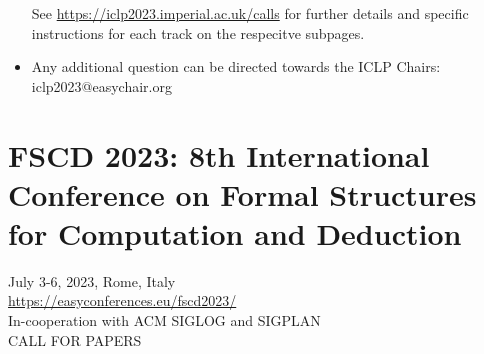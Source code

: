 \documentclass[prodmode,acmtecs]{acmsmall} %
\begin{document}
\begin{itemize}
  See \href{https://iclp2023.imperial.ac.uk/calls}{https://iclp2023.imperial.ac.uk/calls} for further details and specific instructions for each track on the respecitve subpages. 
 
\item  Any additional question can be directed towards the ICLP Chairs: iclp2023@easychair.org 
 
\end{itemize}\section{FSCD 2023: 8th International Conference on Formal Structures for Computation and Deduction}\label{FSCD2023}  July 3-6, 2023, Rome, Italy\\ 
  \href{https://easyconferences.eu/fscd2023/}{https://easyconferences.eu/fscd2023/}\\ 
  In-cooperation with ACM SIGLOG and SIGPLAN\\ 
CALL FOR PAPERS 
\end{document}
